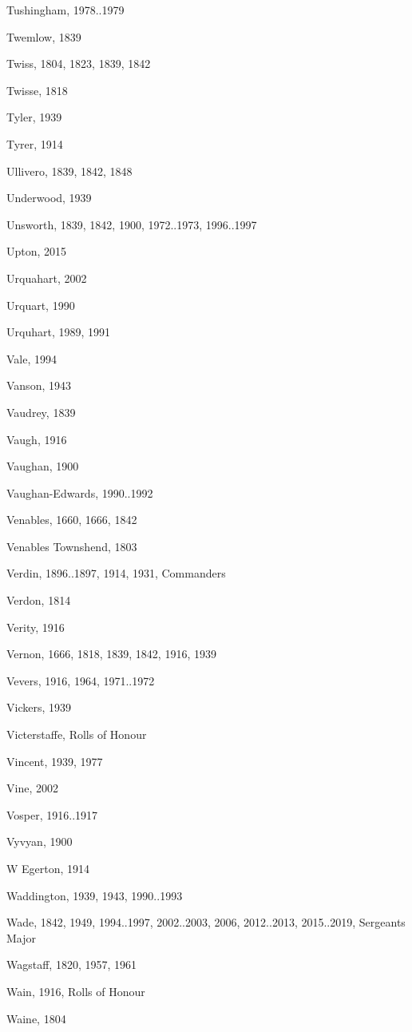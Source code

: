 {\begin{theindex}
\item Tushingham, 1978..1979
\item Twemlow, 1839
\item Twiss, 1804, 1823, 1839, 1842
\item Twisse, 1818
\item Tyler, 1939
\item Tyrer, 1914
\item Ullivero, 1839, 1842, 1848
\item Underwood, 1939
\item Unsworth, 1839, 1842, 1900, 1972..1973, 1996..1997
\item Upton, 2015
\item Urquahart, 2002
\item Urquart, 1990
\item Urquhart, 1989, 1991
\item Vale, 1994
\item Vanson, 1943
\item Vaudrey, 1839
\item Vaugh, 1916
\item Vaughan, 1900
\item Vaughan-Edwards, 1990..1992
\item Venables, 1660, 1666, 1842
\item Venables Townshend, 1803
\item Verdin, 1896..1897, 1914, 1931, Commanders
\item Verdon, 1814
\item Verity, 1916
\item Vernon, 1666, 1818, 1839, 1842, 1916, 1939
\item Vevers, 1916, 1964, 1971..1972
\item Vickers, 1939
\item Victerstaffe, Rolls of Honour
\item Vincent, 1939, 1977
\item Vine, 2002
\item Vosper, 1916..1917
\item Vyvyan, 1900
\item W Egerton, 1914
\item Waddington, 1939, 1943, 1990..1993
\item Wade, 1842, 1949, 1994..1997, 2002..2003, 2006, 2012..2013, 2015..2019, Sergeants Major
\item Wagstaff, 1820, 1957, 1961
\item Wain, 1916, Rolls of Honour
\item Waine, 1804

\end{theindex}}
